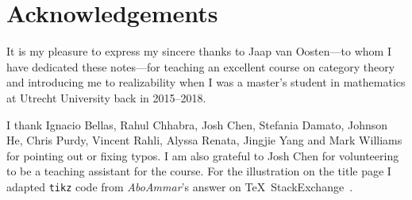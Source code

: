 \chapter{Acknowledgements}

It is my pleasure to express my sincere thanks to Jaap van Oosten---to whom I
have dedicated these notes---for teaching an excellent course on category
theory~\cite{vanOosten2016} and introducing me to realizability when I was a
master's student in mathematics at Utrecht University back in 2015--2018.

I thank Ignacio Bellas, Rahul Chhabra, Josh Chen, Stefania Damato, Johnson He,
Chris Purdy, Vincent Rahli, Alyssa Renata, Jingjie Yang and Mark Williams for
pointing out or fixing typos.
%
I am also grateful to Josh Chen for volunteering to be a teaching assistant for
the course.
%
For the illustration on the title page I adapted \verb|tikz| code from
\emph{AboAmmar}'s answer on \TeX\ StackExchange~\cite{latex-triangle}.

